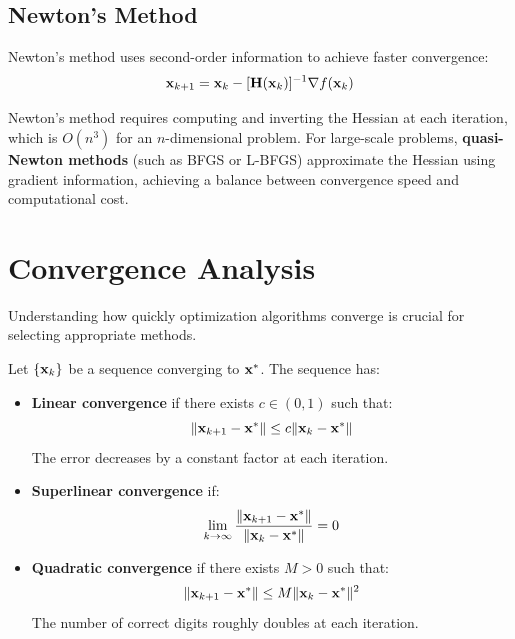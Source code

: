 \subsection{Newton's Method}

Newton's method uses second-order information to achieve faster convergence:
\begin{equation}
\mathbf{x}_{k+1} = \mathbf{x}_k - [\mathbf{H}(\mathbf{x}_k)]^{-1} \nabla f(\mathbf{x}_k)
\end{equation}

\begin{warningbox}[title=Computational Considerations]
Newton's method requires computing and inverting the Hessian at each iteration, which is $O(n^3)$ for an $n$-dimensional problem. For large-scale problems, \textbf{quasi-Newton methods} (such as BFGS or L-BFGS) approximate the Hessian using gradient information, achieving a balance between convergence speed and computational cost.
\end{warningbox}

\section{Convergence Analysis}

Understanding how quickly optimization algorithms converge is crucial for selecting appropriate methods.

\begin{definitionbox}[title=Definition: Convergence Rate]
Let $\{\mathbf{x}_k\}$ be a sequence converging to $\mathbf{x}^*$. The sequence has:
\begin{itemize}
    \item \textbf{Linear convergence} if there exists $c \in (0, 1)$ such that:
    \begin{equation}
    \|\mathbf{x}_{k+1} - \mathbf{x}^*\| \leq c \|\mathbf{x}_k - \mathbf{x}^*\|
    \end{equation}
    The error decreases by a constant factor at each iteration.

    \item \textbf{Superlinear convergence} if:
    \begin{equation}
    \lim_{k \to \infty} \frac{\|\mathbf{x}_{k+1} - \mathbf{x}^*\|}{\|\mathbf{x}_k - \mathbf{x}^*\|} = 0
    \end{equation}

    \item \textbf{Quadratic convergence} if there exists $M > 0$ such that:
    \begin{equation}
    \|\mathbf{x}_{k+1} - \mathbf{x}^*\| \leq M \|\mathbf{x}_k - \mathbf{x}^*\|^2
    \end{equation}
    The number of correct digits roughly doubles at each iteration.
\end{itemize}
\end{definitionbox}

